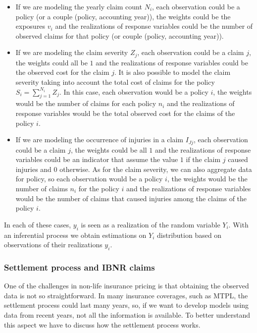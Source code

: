 \documentclass[a4paper, nobind]{templates/ociamthesis}
\providecommand{\tightlist}{%
  \setlength{\itemsep}{0pt}\setlength{\parskip}{0pt}}
\theoremstyle{definition}
\theoremstyle{definition}
\theoremstyle{definition}
\theoremstyle{remark}
\begin{document}
\begin{itemize}
\tightlist
\item
  If we are modeling the yearly claim count \(N_i\), each observation could be a policy (or a couple (policy, accounting year)), the weights could be the exposures \(v_i\) and the realizations of response variables could be the number of observed claims for that policy (or couple (policy, accounting year)).
\item
  If we are modeling the claim severity \(Z_j\), each observation could be a claim \(j\), the weights could all be \(1\) and the realizations of response variables could be the observed cost for the claim \(j\). It is also possible to model the claim severity taking into account the total cost of claims for the policy \(S_i = \sum_{j=1}^{N_i}{Z_j}\). In this case, each observation would be a policy \(i\), the weights would be the number of claims for each policy \(n_i\) and the realizations of response variables would be the total observed cost for the claims of the policy \(i\).
\item
  If we are modeling the occurrence of injuries in a claim \(I_{Jj}\), each observation could be a claim \(j\), the weights could be all \(1\) and the realizations of response variables could be an indicator that assume the value \(1\) if the claim \(j\) caused injuries and \(0\) otherwise. As for the claim severity, we can also aggregate data for policy, so each observation would be a policy \(i\), the weights would be the number of claims \(n_i\) for the policy \(i\) and the realizations of response variables would be the number of claims that caused injuries among the claims of the policy \(i\).
\end{itemize}

In each of these cases, \(y_i\) is seen as a realization of the random variable \(Y_i\). With an inferential process we obtain estimations on \(Y_i\) distribution based on observations of their realizations \(y_i\).

\hypertarget{settlement-process-and-ibnr-claims}{%
\subsubsection{Settlement process and IBNR claims}\label{settlement-process-and-ibnr-claims}}

One of the challenges in non-life insurance pricing is that obtaining the observed data is not so straightforward. In many insurance coverages, such as MTPL, the settlement process could last many years, so, if we want to develop models using data from recent years, not all the information is available. To better understand this aspect we have to discuss how the settlement process works.
\end{document}
